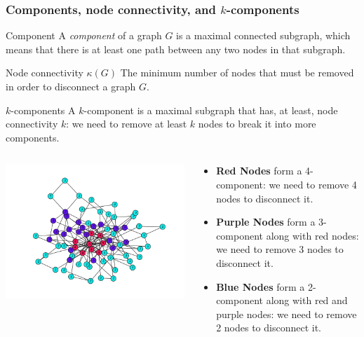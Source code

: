 \documentclass[ignorenonframetext,red,8pt,notes=hide]{beamer}
\begin{document}
\begin{frame}
\frametitle{Components, node connectivity, and $k$-components}

\begin{block}{Component}
A \emph{component} of a graph $G$ is a maximal connected subgraph, which means that there is at least one path between any two nodes in that subgraph.
\end{block}

\begin{block}{Node connectivity $\kappa(G)$}
The minimum number of nodes that must be removed in order to disconnect a graph $G$.
\end{block}

\begin{block}{$k$-components}
A $k$-component is a maximal subgraph that has, at least, node connectivity $k$: we need to remove at least $k$ nodes to break it into more components. 
\end{block}

\pause
\vspace{-0.5cm}

\begin{columns}[c]
\begin{column}{0.4\textwidth}
\begin{center}
\includegraphics[scale=0.25]{img/knum_colors}
\end{center}
\end{column}

\begin{column}{0.6\textwidth}
\begin{itemize}
\item \textbf{Red Nodes} form a 4-component: we need to remove 4 nodes to disconnect it.
\item \textbf{Purple Nodes} form a 3-component along with red nodes: we need to remove 3 nodes to disconnect it.
\item \textbf{Blue Nodes} form a 2-component along with red and purple nodes: we need to remove 2 nodes to disconnect it. 
\end{itemize}
\end{column}
\end{columns}

\end{frame}
\end{document}
